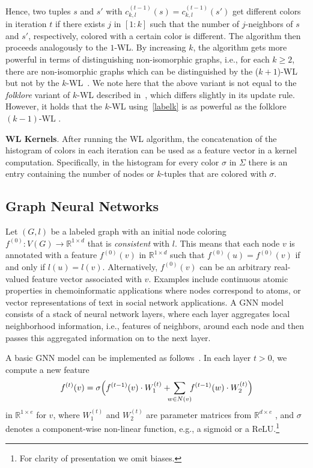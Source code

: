 \documentclass[letterpaper]{article}
\theoremstyle{definition}
\newcommand{\xhdr}[1]{{\noindent\bfseries #1}.}
\newcommand{\bbR}{\ensuremath{\mathbb{R}}}
\newcommand{\RR}{\mathbb{R}}
\begin{document}
Hence, two tuples $s$ and $s'$ with $c_{k,l}^{(t-1)}(s) = c_{k,l}^{(t-1)}(s')$ get different colors in iteration $t$ if there exists $j$ in $[1\!:\!k]$ such that the number of $j$-neighbors of $s$ and $s'$, respectively, colored with a certain color is different. 
The algorithm then proceeds analogously to the \textsc{$1$-WL}. 
By increasing $k$, the algorithm gets more powerful in terms of distinguishing non-isomorphic graphs, i.e., for each $k\geq 2$, there are non-isomorphic graphs which can be distinguished by the ($k+1$)-WL but not by the $k$-WL~\cite{Cai+1992}.
We note here that the above variant is not equal to the \emph{folklore} variant of $k$-WL described in~\cite{Cai+1992}, which differs slightly in its update rule. 
However, it holds that the $k$-WL using~\cref{labelk} is as powerful as the folklore $(k\!-\!1)$-WL \cite{GroheO15}.

\xhdr{WL Kernels}
After running the WL algorithm, the concatenation of the histogram of colors in each iteration can be used as a feature vector in a kernel computation. 
Specifically, in the histogram for every color $\sigma$ in $\Sigma$ there is an entry containing the number of nodes or $k$-tuples that are colored with $\sigma$.

\subsection{Graph Neural Networks}
Let $(G,l)$ be a labeled graph with an initial node coloring $f^{(0)}: V(G)\rightarrow \RR^{1\times d}$ that is \emph{consistent} with $l$.
This means that each node $v$ is annotated with a feature $f^{(0)}(v)$ in $\bbR^{1\times d}$ such that $f^{(0)}(u) = f^{(0)}(v)$ if and only if $l(u) = l(v)$.
Alternatively, $f^{(0)}(v)$ can be an arbitrary  real-valued feature vector associated with $v$.
Examples include continuous atomic properties in chemoinformatic applications where nodes correspond to atoms, or vector representations of text in social network applications. 
A GNN model consists of a stack of neural network layers, where each layer aggregates local neighborhood information, i.e., features of neighbors, around each node and then passes this aggregated information on to the next layer. 

A basic GNN model can be implemented as follows~\cite{Ham+2017a}.
In each layer $t > 0$,  we compute a new feature 
\begin{equation}\label{eq:basicgnn}
	f^{(t)}(v) = \sigma \Big( f^{(t-1)}(v) \cdot  W^{(t)}_1 +\, \sum_{\mathclap{w \in N(v)}}\,\, f^{(t-1)}(w) \cdot W_2^{(t)} \Big)
\end{equation}
in  $\bbR^{1 \times e}$ for $v$, where 
$W_1^{(t)}$ and $W_2^{(t)}$ are parameter matrices from $\bbR^{d \times e}$
, and $\sigma$ denotes a component-wise non-linear function, e.g., a sigmoid or a ReLU.\footnote{For clarity of presentation we omit biases.}
\end{document}
